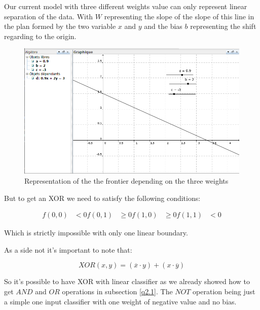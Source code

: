 
Our current model with three different weights value can only represent linear separation of the data.
With $W$ representing the slope of the slope of this line in the plan formed by the two variable $x$ and $y$ and the
bias $b$ representing the shift regarding to the origin.

\begin{figure}[h!]
    \begin{center}
        \includegraphics[width=.6\linewidth]{../2_logic_XOR/xor_graph.png}
        \caption{Representation of the the frontier depending on the three weights}
    \end{center}
\end{figure}

But to get an XOR we need to satisfy the following conditions:

\begin{align*}
    f(0,0) &< 0
    f(0,1) &\geq 0
    f(1,0) &\geq 0
    f(1,1) &< 0
\end{align*}

Which is strictly impossible with only one linear boundary.

As a side not it's important to note that:

\[
    XOR(x, y) = \left( \overline{x} \cdot y \right) + ( x \cdot \overline{y} )
\]

So it's possible to have XOR with linear classifier as we already showed how to get $AND$ and $OR$ operations
in subsection \ref{q2.1}.
The $NOT$ operation being just a simple one input classifier with one weight of negative value and no bias.



